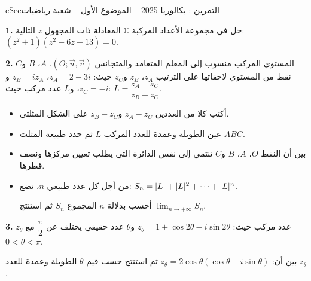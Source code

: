 \documentclass[12pt,a4paper]{article}
\newenvironment{BOX}[2]{\begin{otherlanguage}{english}\begin{arbox}{#1}{#2}}{\end{arbox}\end{otherlanguage}}
\newcounter{exo}
\newenvironment{tamrin}[1]{\stepcounter{exo}\begin{BOX}{cSec}{التمرين \theexo: #1}}{\end{BOX}}
\renewcommand{\cdots}{\mathinner{\cdotp\cdotp\cdotp}}
\newenvironment{sq}{\begin{itemize}[leftmargin=2.4em,itemsep=3pt]}{\end{itemize}}
\newcommand{\qa}{\item[(أ)]}\newcommand{\qb}{\item[(ب)]}\newcommand{\qc}{\item[(جـ)]}\newcommand{\qd}{\item[(د)]}\newcommand{\qe}{\item[(هـ)]}
\newcommand{\QQ}[1]{\par\smallskip\textbf{#1.} }
\begin{document}
\begin{tamrin}{بكالوريا 2025 -- الموضوع الأول -- شعبة رياضيات}
\QQ{1} حل في مجموعة الأعداد المركبة $\mathbb{C}$ المعادلة ذات المجهول $z$ التالية: $\left(z^2+1\right)\left(z^2-6z+13\right)=0$.

\QQ{2} المستوي المركب منسوب إلى المعلم المتعامد والمتجانس $\left(O;\vec u,\vec v\right)$.
$A$، $B$ و$C$ نقط من المستوي لاحقاتها على الترتيب $z_A$، $z_B$ و$z_C$ حيث: $z_A=2-3i$، $z_B=iz_A$ و$z_C=-i$،
و$L$ عدد مركب حيث: $L=\dfrac{z_A-z_C}{z_B-z_C}$.
\begin{sq}
\qa أكتب كلا من العددين $z_A-z_C$ و$z_B-z_C$ على الشكل المثلثي.
\qb عين الطويلة وعمدة للعدد المركب $L$ ثم حدد طبيعة المثلث $ABC$.
\qc بين أن النقط $O$، $A$، $B$ و$C$ تنتمي إلى نفس الدائرة التي يطلب تعيين مركزها ونصف قطرها.
\qd من أجل كل عدد طبيعي $n$، نضع: $S_n=|L|+|L|^2+\cdots+|L|^n$.

أحسب بدلالة $n$ المجموع $S_n$ ثم استنتج $\displaystyle\lim_{n\to+\infty}S_n$.
\end{sq}
\QQ{3} $z_\theta$ عدد مركب حيث: $z_\theta=1+\cos2\theta-i\sin2\theta$ و$\theta$ عدد حقيقي يختلف عن $\dfrac{\pi}{2}$ مع $0<\theta<\pi$.

بين أن: $z_\theta=2\cos\theta\left(\cos\theta-i\sin\theta\right)$ ثم استنتج حسب قيم $\theta$ الطويلة وعمدة للعدد $z_\theta$.
\end{tamrin}
\end{document}
